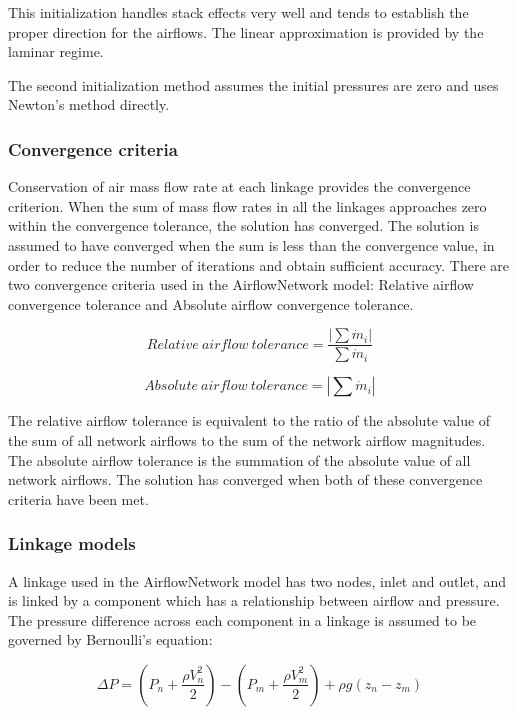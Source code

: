 This initialization handles stack effects very well and tends to establish the proper direction for the airflows. The linear approximation is provided by the laminar regime.

The second initialization method assumes the initial pressures are zero and uses Newton's method directly.

\subsubsection{Convergence criteria}\label{convergence-criteria}

Conservation of air mass flow rate at each linkage provides the convergence criterion. When the sum of mass flow rates in all the linkages approaches zero within the convergence tolerance, the solution has converged. The solution is assumed to have converged when the sum is less than the convergence value, in order to reduce the number of iterations and obtain sufficient accuracy. There are two convergence criteria used in the AirflowNetwork model: Relative airflow convergence tolerance and Absolute airflow convergence tolerance.

\begin{equation}
Relative~airflow~tolerance = \frac{\left| \sum \dot{m}_i \right|}{\sum \dot{m}_i}
\end{equation}

\begin{equation}
Absolute~airflow~tolerance = \left| \sum \dot{m}_i \right|
\end{equation}

The relative airflow tolerance is equivalent to the ratio of the absolute value of the sum of all network airflows to the sum of the network airflow magnitudes.~ The absolute airflow tolerance is the summation of the absolute value of all network airflows. The solution has converged when both of these convergence criteria have been met.

\subsubsection{Linkage models}\label{linkage-models}

A linkage used in the AirflowNetwork model has two nodes, inlet and outlet, and is linked by a component which has a relationship between airflow and pressure.~ The pressure difference across each component in a linkage is assumed to be governed by Bernoulli's equation:

\begin{equation}
\Delta P = \left( {P_n + \frac{{\rho V_n^2}}{2}} \right) - \left( {P_m + \frac{{\rho V_m^2}}{2}} \right) + \rho g\left( {z_n - z_m} \right)
\end{equation}

